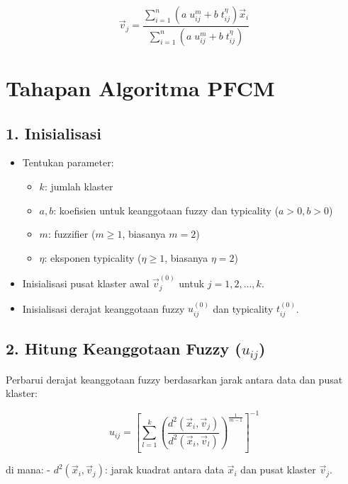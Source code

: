 \documentclass[
  oneside]{book}
\providecommand{\tightlist}{%
  \setlength{\itemsep}{0pt}\setlength{\parskip}{0pt}}
\begin{document}
\[
\vec{v}_j = \frac{\sum_{i=1}^n \left(a \; u_{ij}^m + b \; t_{ij}^\eta \right) \vec{x}_i}{\sum_{i=1}^n \left(a \; u_{ij}^m + b \; t_{ij}^\eta \right)}
\]

\section{Tahapan Algoritma PFCM}\label{tahapan-algoritma-pfcm}

\subsection*{1. Inisialisasi}\label{inisialisasi-4}

\begin{itemize}
\tightlist
\item
  Tentukan parameter:

  \begin{itemize}
  \tightlist
  \item
    \(k\): jumlah klaster
  \item
    \(a, b\): koefisien untuk keanggotaan fuzzy dan typicality (\(a > 0, b > 0\))
  \item
    \(m\): fuzzifier (\(m \geq 1\), biasanya \(m = 2\))
  \item
    \(\eta\): eksponen typicality (\(\eta \geq 1\), biasanya \(\eta = 2\))
  \end{itemize}
\item
  Inisialisasi pusat klaster awal \(\vec{v}_j^{(0)}\) untuk \(j = 1, 2, ..., k\).
\item
  Inisialisasi derajat keanggotaan fuzzy \(u_{ij}^{(0)}\) dan typicality \(t_{ij}^{(0)}\).
\end{itemize}

\subsection*{\texorpdfstring{2. Hitung Keanggotaan Fuzzy (\(u_{ij}\))}{2. Hitung Keanggotaan Fuzzy (u\_\{ij\})}}\label{hitung-keanggotaan-fuzzy-u_ij}

Perbarui derajat keanggotaan fuzzy berdasarkan jarak antara data dan pusat klaster:

\[
u_{ij} = \left[\sum_{l=1}^k \left(\frac{d^2(\vec{x}_i, \vec{v}_j)}{d^2(\vec{x}_i, \vec{v}_l)}\right)^{\frac{1}{m-1}}\right]^{-1}
\]

di mana: - \(d^2(\vec{x}_i, \vec{v}_j)\): jarak kuadrat antara data \(\vec{x}_i\) dan pusat klaster \(\vec{v}_j\).
\end{document}
